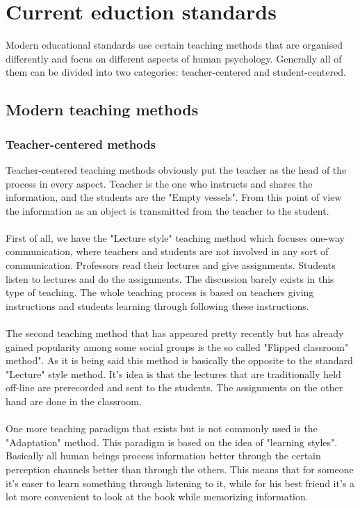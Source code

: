 \documentclass[10pt,oneside,english,a4paper]{article}
\begin{document}
\section{Current eduction standards} \label{back}
Modern educational standards use certain teaching methods that are organised differently and focus on different aspects of human psychology.  Generally all of them can be divided into two categories: teacher-centered and student-centered.
\subsection{Modern teaching methods}
\subsubsection{Teacher-centered methods}
Teacher-centered teaching methods obviously put the teacher as the head of the process in every aspect. Teacher is the one who instructs and shares the information, and the students are the "Empty vessels". \cite{vessel} From this point of view the information as an object is transmitted from the teacher to the student. \paragraph{}
First of all, we have the "Lecture style"  teaching method which focuses one-way communication, where teachers and students are not involved in any sort of communication. Professors read their lectures and give assignments. Students listen to lectures and do the assignments. The discussion barely exists in this type of teaching. The whole teaching process is based on teachers giving instructions and students learning through following these instructions.\paragraph{}
The second teaching method that has appeared pretty recently but has already gained popularity among some social groups is the so called "Flipped classroom" method".\cite{Flipped} As it is being said this method is basically the opposite to the standard "Lecture" style method. It's idea is that the lectures that are traditionally held off-line are prerecorded and sent to the students. The  assignments on the other hand are done in the classroom. \paragraph{}
One more teaching paradigm that exists but is not commonly used is the "Adaptation" method.\cite {Learning} This paradigm is based on the idea of "learning styles". Basically all human beings process information better through the certain perception channels better than through the others. This means that for someone it's easer to learn something through listening to it, while for his best friend it's a lot more convenient to look at the book while memorizing information. 
\end{document}
